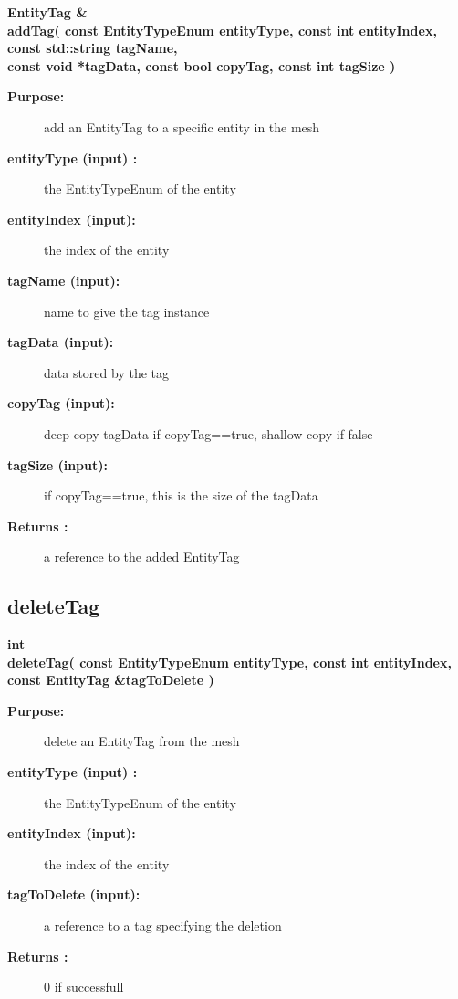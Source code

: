 \begin{flushleft} \textbf{%
EntityTag \&  \\ 
\settowidth{\UnstructuredMappingIncludeArgIndent}{addTag(}%
addTag( const  EntityTypeEnum entityType, const int entityIndex, const std::string tagName,\\ 
\hspace{\UnstructuredMappingIncludeArgIndent}const void *tagData, const bool copyTag, const int tagSize )
}\end{flushleft}
\begin{description}
\item[{\bf Purpose:}]  
    add an EntityTag to a specific entity in the mesh
\item[{\bf entityType (input) :}]  the EntityTypeEnum of the entity
\item[{\bf entityIndex (input):}]  the index of the entity
\item[{\bf tagName    (input):}]  name to give the tag instance
\item[{\bf tagData    (input):}]  data stored by the tag
\item[{\bf copyTag    (input):}]  deep copy tagData if copyTag==true, shallow copy if false
\item[{\bf tagSize    (input):}]  if copyTag==true, this is the size of the tagData
\item[{\bf Returns :}]  a reference to the added EntityTag 
\end{description}
\subsection{deleteTag}
 
\begin{flushleft} \textbf{%
int  \\ 
\settowidth{\UnstructuredMappingIncludeArgIndent}{deleteTag(}%
deleteTag( const  EntityTypeEnum entityType, const int entityIndex, \\ 
\hspace{\UnstructuredMappingIncludeArgIndent}const EntityTag \&tagToDelete )
}\end{flushleft}
\begin{description}
\item[{\bf Purpose:}]  
    delete an EntityTag from the mesh
\item[{\bf entityType (input) :}]  the EntityTypeEnum of the entity
\item[{\bf entityIndex (input):}]  the index of the entity
\item[{\bf tagToDelete    (input):}]  a reference to a tag specifying the deletion
\item[{\bf Returns :}]  0 if successfull
\end{description}
